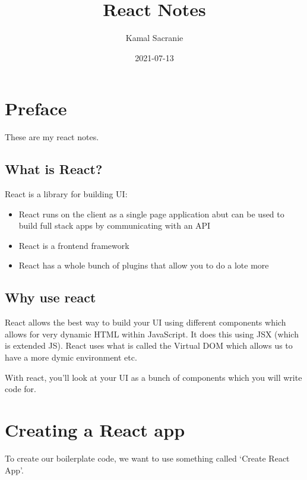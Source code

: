 \documentclass[
]{report}
\title{React Notes}
\author{Kamal Sacranie}
\date{2021-07-13}
\providecommand{\tightlist}{%
  \setlength{\itemsep}{0pt}\setlength{\parskip}{0pt}}
\begin{document}
\maketitle

{
\setcounter{tocdepth}{1}
\tableofcontents
}
\hypertarget{preface}{%
\chapter*{Preface}\label{preface}}

These are my react notes.

\hypertarget{what-is-react}{%
\section{What is React?}\label{what-is-react}}

React is a library for building UI:

\begin{itemize}
\tightlist
\item
  React runs on the client as a single page application abut can be used to
  build full stack apps by communicating with an API
\item
  React is a frontend framework
\item
  React has a whole bunch of plugins that allow you to do a lote more
\end{itemize}

\hypertarget{why-use-react}{%
\section{Why use react}\label{why-use-react}}

React allows the best way to build your UI using different components which
allows for very dynamic HTML within JavaScript. It does this using JSX (which
is extended JS). React uses what is called the Virtual DOM which allows us to
have a more dymic environment etc.

With react, you'll look at your UI as a bunch of components which you will
write code for.

\hypertarget{creating-a-react-app}{%
\chapter{Creating a React app}\label{creating-a-react-app}}

To create our boilerplate code, we want to use something called `Create React App'.
\end{document}
